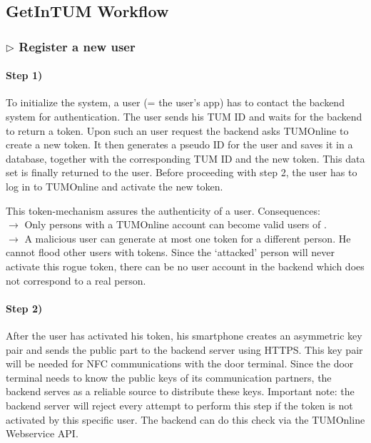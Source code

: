 \subsection{GetInTUM Workflow}\label{sec:workflow}

\subsubsection*{$\triangleright$ Register a new user}

\paragraph{Step 1)}
To initialize the system, a user (= the user's \app app) has to contact the backend system for authentication.
The user sends his TUM ID and waits for the backend to return a token.
Upon such an user request the backend asks TUMOnline to create a new token.
It then generates a pseudo ID for the user and saves it in a database, together with the corresponding TUM ID and the new token.
This data set is finally returned to the user.
Before proceeding with step 2, the user has to log in to TUMOnline and activate the new token.

\medskip

\noindent This token-mechanism assures the authenticity of a user. Consequences:\\
$\rightarrow$ Only persons with a TUMOnline account can become valid users of \app.\\
$\rightarrow$ A malicious user can generate at most one token for a different person. He cannot flood other users with tokens. Since the `attacked' person will never activate this rogue token, there can be no user account in the backend which does not correspond to a real person.



\paragraph{Step 2)}
After the user has activated his token, his smartphone creates an asymmetric key pair and sends the public part to the backend server using HTTPS.
This key pair will be needed for NFC communications with the door terminal.
Since the door terminal needs to know the public keys of its communication partners, the backend serves as a reliable source to distribute these keys.
Important note: the backend server will reject every attempt to perform this step if the token is not activated by this specific user. The backend can do this check via the TUMOnline Webservice API.



